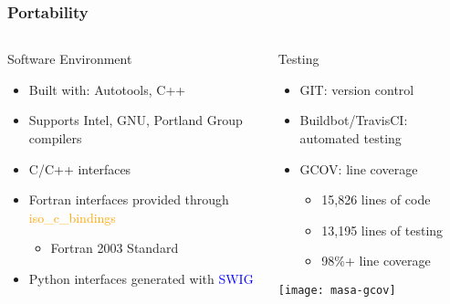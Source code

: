 \documentclass[mathserif]{beamer}
\begin{document}
\begin{frame}
  \frametitle{Portability}  

  \begin{columns}[c]
    \begin{column}{5cm}
      \begin{block}{Software Environment}  
        \begin{itemize}
          \small
        \item Built with: Autotools, C++
        \item Supports Intel, GNU, Portland Group compilers
        \item C/C++ interfaces
        \item Fortran interfaces provided through \textcolor{orange}{iso\_c\_bindings}
          \begin{itemize}
          \item \tiny Fortran 2003 Standard
          \end{itemize}
        \item Python interfaces generated with \textcolor{blue}{SWIG}
        \end{itemize}          
      \end{block}
    \end{column}

    \begin{column}{5cm}
      \begin{block}{Testing}  
        \begin{itemize}
        \item \small GIT: version control
        \item \small Buildbot/TravisCI: automated testing
        \item \small GCOV: line coverage
          \begin{itemize}
          \item \small 15,826 lines of code
          \item \small 13,195 lines of testing
          \item \small 98\%+ line coverage
          \end{itemize}          
        \end{itemize}          
      \end{block}

     \texttt{[image: masa-gcov]}
  
    \end{column}
  \end{columns}

\end{frame}
\end{document}
